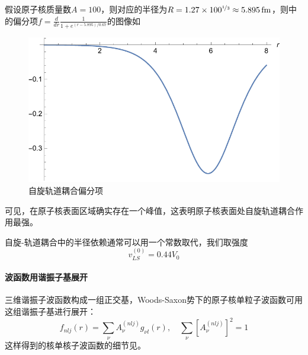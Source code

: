 \begin{example}[自旋-轨道耦合偏分项]
	假设原子核质量数$A = 100$，则对应的半径为$R = 1.27 \times 100^{\nicefrac{1}{3}} \approx 5.895\, \rm{fm}$，则中的偏分项$f = \frac{d}{dr} \frac{1}{1 + e^{(r-5.895)/0.67}}$的图像如
	\begin{figure}[htbp]
		\centering
		\includegraphics[scale=0.6]{figure/nuclear/spin-orbit-der.pdf}
		\caption{自旋轨道耦合偏分项}
		\label{fig:spin-orbit-der-term}
	\end{figure}
	可见，在原子核表面区域确实存在一个峰值，这表明原子核表面处自旋轨道耦合作用最强。
\end{example}
自旋-轨道耦合中的半径依赖通常可以用一个常数取代，我们取强度
\begin{equation}
	v_{LS}^{(0)} = 0.44 V_0
\end{equation}

\paragraph*{波函数用谐振子基展开}
三维谐振子波函数构成一组正交基，Woods-Saxon势下的原子核单粒子波函数可用这组谐振子基进行展开：
\begin{equation}
	f_{nlj}(r) = \sum_{\nu} A_{\nu}^{(nlj)} g_{\nu l}(r), \quad \sum_{\nu} [A_{\nu}^{(nlj)}]^2 = 1
\end{equation}
这样得到的核单核子波函数的细节见。

